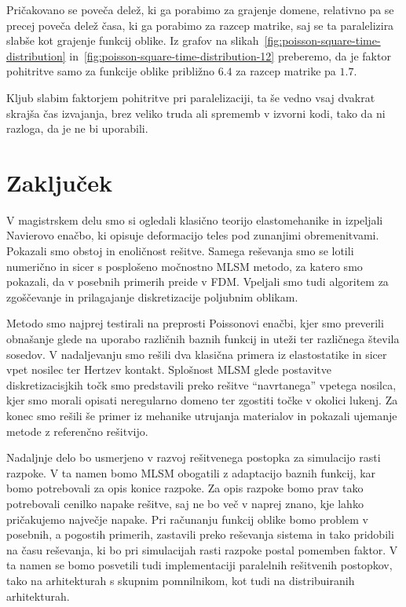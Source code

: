 \documentclass[12pt,a4paper,twoside]{article}
\theoremstyle{definition} %
\theoremstyle{plain} %
\numberwithin{equation}{section}
\begin{document}
Pričakovano se poveča delež, ki ga porabimo za grajenje domene, relativno pa se precej poveča delež
časa, ki ga porabimo za razcep matrike, saj se ta paralelizira slabše kot grajenje funkcij oblike.
Iz grafov na slikah~\ref{fig:poisson-square-time-distribution}
in~\ref{fig:poisson-square-time-distribution-12} preberemo, da je faktor pohitritve samo za funkcije
oblike približno $6.4$ za razcep matrike pa $1.7$.

Kljub slabim faktorjem pohitritve pri paralelizaciji, ta še vedno vsaj dvakrat skrajša čas izvajanja,
brez veliko truda ali sprememb v izvorni kodi, tako da ni razloga, da je ne bi uporabili.

\section{Zaključek}

V magistrskem delu smo si ogledali klasično teorijo elastomehanike in izpeljali Navierovo enačbo,
ki opisuje deformacijo teles pod zunanjimi obremenitvami. Pokazali smo obstoj in enoličnost rešitve.
Samega reševanja smo se lotili numerično in sicer s posplošeno močnostno MLSM metodo, za katero smo
pokazali, da v posebnih primerih preide v FDM. Vpeljali smo tudi algoritem za zgoščevanje in
prilagajanje diskretizacije poljubnim oblikam.

Metodo smo najprej testirali na preprosti Poissonovi enačbi, kjer smo preverili obnašanje glede na
uporabo različnih baznih funkcij in uteži ter različnega števila sosedov. V nadaljevanju smo rešili
dva klasična primera iz elastostatike in sicer vpet nosilec ter Hertzev kontakt. Splošnost MLSM
glede postavitve diskretizacisjkih točk smo predstavili preko rešitve ``navrtanega'' vpetega
nosilca, kjer smo morali opisati neregularno domeno ter zgostiti točke v okolici lukenj. Za konec
smo rešili še primer iz mehanike utrujanja materialov in pokazali ujemanje metode z referenčno
rešitvijo.

Nadaljnje delo bo usmerjeno v razvoj rešitvenega postopka za simulacijo rasti razpoke. V ta namen
bomo MLSM obogatili z adaptacijo baznih funkcij, kar bomo potrebovali za opis konice razpoke. Za
opis razpoke bomo prav tako potrebovali cenilko napake rešitve, saj ne bo več v naprej znano, kje
lahko pričakujemo največje napake. Pri računanju funkcij oblike bomo problem v posebnih, a pogostih
primerih, zastavili preko reševanja sistema in tako pridobili na času reševanja, ki bo pri
simulacijah rasti razpoke postal pomemben faktor. V ta namen se bomo posvetili tudi implementaciji
paralelnih rešitvenih postopkov, tako na arhitekturah s skupnim pomnilnikom, kot tudi na
distribuiranih arhitekturah.
\end{document}
